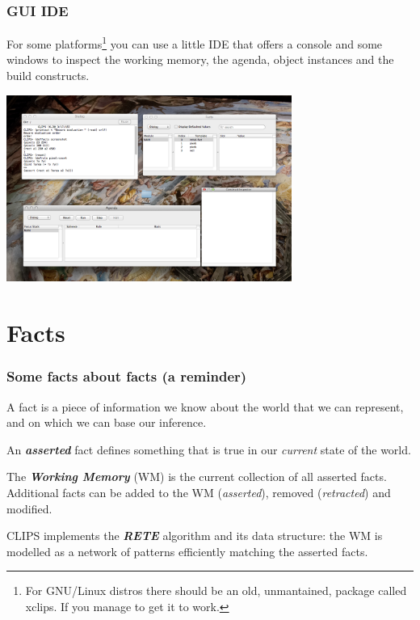 \documentclass[xcolor={usenames,dvipsnames,svgnames}, compress]{beamer}
\begin{document}
\begin{frame}
  \frametitle{GUI IDE}
  For some platforms\footnote{For GNU/Linux distros there should be an old,
    unmantained, package called \textsf{xclips}. If you manage to get
    it to work.} you can use a little IDE that offers a console
  and some windows to inspect the working memory, the agenda, object
  instances and the build constructs.
  \begin{center}
    \includegraphics[width=0.7\textwidth]{Figures/clips-IDE}
  \end{center}
  
  
\end{frame}

\section{Facts}
{
  \begin{frame}
    \sectionpage
  \end{frame}
}

\begin{frame}
  \frametitle{Some facts about facts (a reminder)}
  A fact is a piece of information we know about the world that we can represent, and on which we
  can base our inference.\par\bigskip
  
  An \textbf{\emph{asserted}} fact defines something that is true in our \emph{current} state
  of the world.\par\bigskip
  
  The \emph{\textbf{Working Memory}} (WM) is the current collection of
  all asserted facts. Additional facts can be added to the WM
  (\emph{asserted}), removed (\emph{retracted}) and
  modified.\par\bigskip

  CLIPS implements the \textbf{\emph{RETE}} algorithm and its data
  structure: the WM is modelled as a network of patterns efficiently
  matching the asserted facts. 
  
\end{frame}
\end{document}
